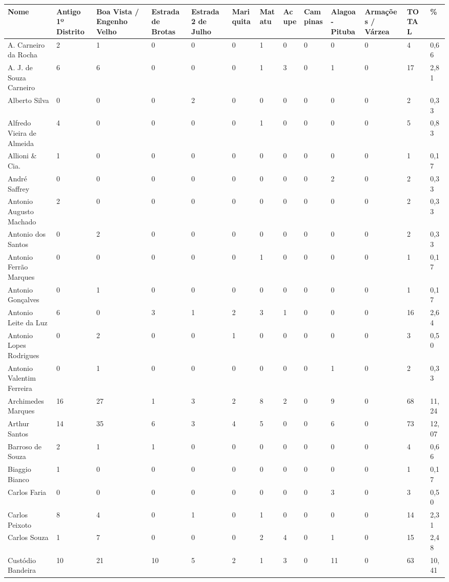 \begin{table}[!htp]
{
\begin{tiny}
\begin{tabular}{lllllllllllll}
\toprule
Nome	&Antigo 1º Distrito	&Boa Vista / Engenho Velho	&Estrada de Brotas	&Estrada 2 de Julho	&Mariquita	&Matatu	&Acupe	&Campinas	&Alagoa-Pituba	&Armações / Várzea	&TOTAL	&\%\\
\midrule
\midrule
A. Carneiro da Rocha	&2	&1	&0	&0	&0	&1	&0	&0	&0	&0	&4	&0,66\\
A. J. de Souza Carneiro	&6	&6	&0	&0	&0	&1	&3	&0	&1	&0	&17	&2,81\\
Alberto Silva	&0	&0	&0	&2	&0	&0	&0	&0	&0	&0	&2	&0,33\\
Alfredo Vieira de Almeida	&4	&0	&0	&0	&0	&1	&0	&0	&0	&0	&5	&0,83\\
Allioni \& Cia.	&1	&0	&0	&0	&0	&0	&0	&0	&0	&0	&1	&0,17\\
André Saffrey	&0	&0	&0	&0	&0	&0	&0	&0	&2	&0	&2	&0,33\\
Antonio Augusto Machado	&2	&0	&0	&0	&0	&0	&0	&0	&0	&0	&2	&0,33\\
Antonio dos Santos	&0	&2	&0	&0	&0	&0	&0	&0	&0	&0	&2	&0,33\\
Antonio Ferrão Marques	&0	&0	&0	&0	&0	&1	&0	&0	&0	&0	&1	&0,17\\
Antonio Gonçalves	&0	&1	&0	&0	&0	&0	&0	&0	&0	&0	&1	&0,17\\
Antonio Leite da Luz	&6	&0	&3	&1	&2	&3	&1	&0	&0	&0	&16	&2,64\\
Antonio Lopes Rodrigues	&0	&2	&0	&0	&1	&0	&0	&0	&0	&0	&3	&0,50\\
Antonio Valentim Ferreira	&0	&1	&0	&0	&0	&0	&0	&0	&1	&0	&2	&0,33\\
Archimedes Marques	&16	&27	&1	&3	&2	&8	&2	&0	&9	&0	&68	&11,24\\
Arthur Santos	&14	&35	&6	&3	&4	&5	&0	&0	&6	&0	&73	&12,07\\
Barroso de Souza	&2	&1	&1	&0	&0	&0	&0	&0	&0	&0	&4	&0,66\\
Biaggio Bianco	&1	&0	&0	&0	&0	&0	&0	&0	&0	&0	&1	&0,17\\
Carlos Faria	&0	&0	&0	&0	&0	&0	&0	&0	&3	&0	&3	&0,50\\
Carlos Peixoto	&8	&4	&0	&1	&0	&1	&0	&0	&0	&0	&14	&2,31\\
Carlos Souza	&1	&7	&0	&0	&0	&2	&4	&0	&1	&0	&15	&2,48\\
Custódio Bandeira	&10	&21	&10	&5	&2	&1	&3	&0	&11	&0	&63	&10,41\\

\end{tabular}
\end{tiny}}
\end{table}
